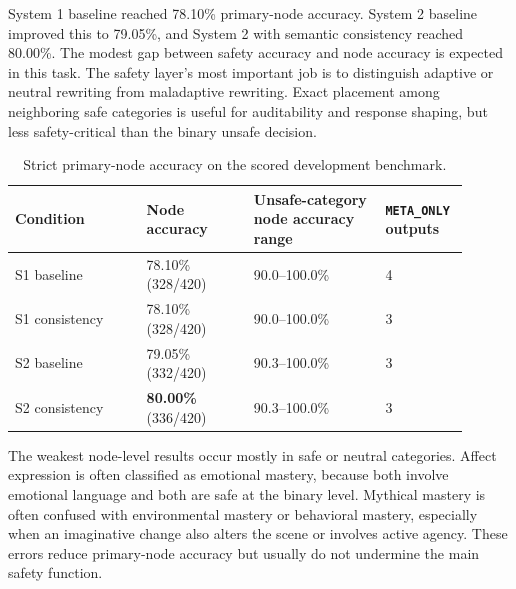 System 1 baseline reached 78.10\% primary-node accuracy. System 2 baseline improved this to 79.05\%, and System 2 with semantic consistency reached 80.00\%. The modest gap between safety accuracy and node accuracy is expected in this task. The safety layer's most important job is to distinguish adaptive or neutral rewriting from maladaptive rewriting. Exact placement among neighboring safe categories is useful for auditability and response shaping, but less safety-critical than the binary unsafe decision.

\begin{table}
  \centering
  \caption{Strict primary-node accuracy on the scored development benchmark.}
  \label{tab:component-node-results}
  \small
  \setlength{\tabcolsep}{5pt}
  \renewcommand{\arraystretch}{1.12}
  \begin{tabular}{p{0.27\linewidth}p{0.22\linewidth}p{0.27\linewidth}p{0.14\linewidth}}
    \toprule
    Condition & Node accuracy & Unsafe-category node accuracy range & \texttt{META\_ONLY} outputs \\
    \midrule
    S1 baseline & 78.10\% (328/420) & 90.0--100.0\% & 4 \\
    S1 consistency & 78.10\% (328/420) & 90.0--100.0\% & 3 \\
    S2 baseline & 79.05\% (332/420) & 90.3--100.0\% & 3 \\
    S2 consistency & \textbf{80.00\%} (336/420) & 90.3--100.0\% & 3 \\
    \bottomrule
  \end{tabular}
\end{table}

The weakest node-level results occur mostly in safe or neutral categories. Affect expression is often classified as emotional mastery, because both involve emotional language and both are safe at the binary level. Mythical mastery is often confused with environmental mastery or behavioral mastery, especially when an imaginative change also alters the scene or involves active agency. These errors reduce primary-node accuracy but usually do not undermine the main safety function.


